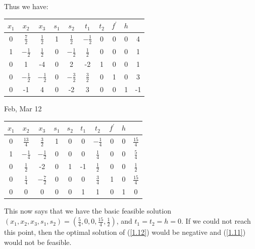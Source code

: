 Thus we have:
\begin{table}[H]
        \centering
        \begin{tabular}{|ccccccccc|c|}
        \hline
        $x_1$ & $x_2$ & $x_3$ & $s_1$ & $s_2$& $t_1$ & $t_2$ & $f^{\prime}$ & $h$ & \\ \hline
        0 & $\frac{7}{2}$ & $\frac{1}{2}$ & 1 & $\frac{1}{2}$ & $-\frac{1}{2}$ & 0 & 0 & 0 & 4 \\
        1 & $-\frac{1}{2}$ & $\frac{1}{2}$ & 0 & $-\frac{1}{2}$ & $\frac{1}{2}$ & 0 & 0 & 0 & 1\\ 
        0 & 1 & -4 & 0 & 2 & -2 & 1 & 0 & 0 & 1\\ \hline
        0 & $-\frac{1}{2}$ & $-\frac{1}{2}$ & 0 & $-\frac{3}{2}$ & $\frac{3}{2}$ & 0 & 1 & 0 & 3 \\ 
        0 & -1 & 4 & 0 & -2 & 3 & 0 & 0 & 1 & -1\\ \hline
        \end{tabular}
        \label{tab-12-3}
\end{table}
\begin{center}
    Feb, Mar 12
\end{center}
\begin{table}[H]
        \centering
        \begin{tabular}{|ccccccccc|c|}
        \hline
        $x_1$ & $x_2$ & $x_3$ & $s_1$ & $s_2$& $t_1$ & $t_2$ & $f^{\prime}$ & $h$ & \\ \hline
        0 & $\frac{13}{4}$ & $\frac{3}{2}$ & 1 & 0 & 0 & $-\frac{1}{4}$ & 0 & 0 & $\frac{15}{4}$ \\
        1 & $-\frac{1}{4}$ & $-\frac{1}{2}$ & 0 & 0 & 0 & $\frac{1}{4}$ & 0 & 0 & $\frac{5}{4}$\\ 
        0 & $\frac{1}{2}$ & -2 & 0 & 1 & -1 & $\frac{1}{2}$ & 0 & 0 & $\frac{1}{2}$\\ \hline
        0 & $\frac{1}{4}$ & $-\frac{7}{2}$ & 0 & 0 & 0 & $\frac{3}{4}$ & 1 & 0 & $\frac{15}{4}$ \\ 
        0 & 0 & 0 & 0 & 0 & 1 & 1 & 0 & 1 & 0\\ \hline
        \end{tabular}
        \label{tab-12-4}
\end{table}

This now says that we have the basic feasible solution $(x_1, x_2, x_3, s_1, s_2) = (\frac{5}{4},0, 0, \frac{15}{4}, \frac{1}{2})$, and $t_1=t_2=h=0$. If we could not reach this point, then the optimal solution of (\ref{1.12}) would be negative and (\ref{1.11}) would not be feasible.

